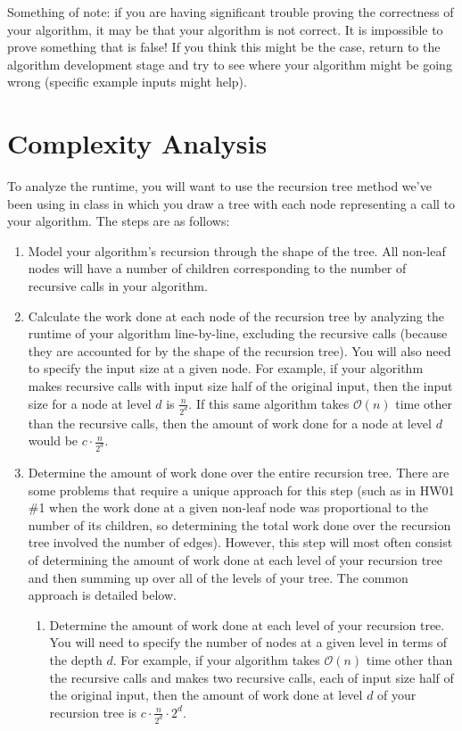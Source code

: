 \documentclass[11pt]{article}
\newcommand{\bigo}{\mathcal{O}}
\begin{document}
Something of note: if you are having significant trouble proving the correctness of your algorithm, it may be that your algorithm is not correct. It is impossible to prove something that is false! If you think this might be the case, return to the algorithm development stage and try to see where your algorithm might be going wrong (specific example inputs might help). 

\section{Complexity Analysis}
To analyze the runtime, you will want to use the recursion tree method we've been using in class in which you draw a tree with each node representing a call to your algorithm. The steps are as follows:

\begin{enumerate}
    \item Model your algorithm's recursion through the shape of the tree. All non-leaf nodes will have a number of children corresponding to the number of recursive calls in your algorithm.
    
    \item Calculate the work done at each node of the recursion tree by analyzing the runtime of your algorithm line-by-line, excluding the recursive calls (because they are accounted for by the shape of the recursion tree). You will also need to specify the input size at a given node. For example, if your algorithm makes recursive calls with input size half of the original input, then the input size for a node at level $d$ is $\frac{n}{2^d}$. If this same algorithm takes $\bigo(n)$ time other than the recursive calls, then the amount of work done for a node at level $d$ would be $c \cdot \frac{n}{2^d}$.
    
    \item Determine the amount of work done over the entire recursion tree. There are some problems that require a unique approach for this step (such as in HW01 \#1 when the work done at a given non-leaf node was proportional to the number of its children, so determining the total work done over the recursion tree involved the number of edges). However, this step will most often consist of determining the amount of work done at each level of your recursion tree and then summing up over all of the levels of your tree. The common approach is detailed below.
    
    \begin{enumerate}
        \item Determine the amount of work done at each level of your recursion tree. You will need to specify the number of nodes at a given level in terms of the depth $d$. For example, if your algorithm takes $\bigo(n)$ time other than the recursive calls and makes two recursive calls, each of input size half of the original input, then the amount of work done at level $d$ of your recursion tree is $c \cdot \frac{n}{2^d} \cdot 2^d$.
        

\end{enumerate}
\end{enumerate}
\end{document}
